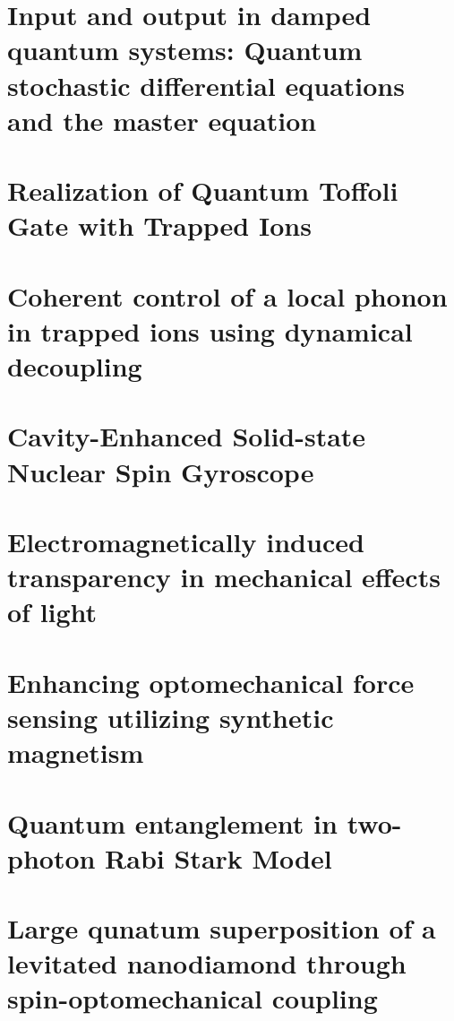 \documentclass{report}
\begin{document}
  \maketitle
  \tableofcontents
  \chapter{Input and output in damped quantum systems: Quantum stochastic differential equations and the master equation}
    
  \chapter{Realization of Quantum Toffoli Gate with Trapped Ions}
    
  \chapter{Coherent control of a local phonon in trapped ions using dynamical decoupling}
    
  \chapter{Cavity-Enhanced Solid-state Nuclear Spin Gyroscope}
    
  \chapter{Electromagnetically induced transparency in mechanical effects of light}
    
  \chapter{Enhancing optomechanical force sensing utilizing synthetic magnetism}
    
  \chapter{Quantum entanglement in two-photon Rabi Stark Model}
    
  \chapter{Large qunatum superposition of a levitated nanodiamond through spin-optomechanical coupling}
    
  \appendix
\end{document}
